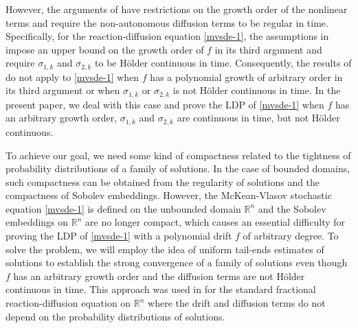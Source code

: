 \documentclass[11pt]{article}
\numberwithin{equation}{section}
\theoremstyle{plain}
\begin{document}
 However, the arguments of \cite{hll2021AMO, hhl2022arXiv}
 have restrictions on the growth order of the nonlinear terms
 and require the  non-autonomous diffusion terms to be regular in time.
 Specifically, for the reaction-diffusion equation \eqref{mvsde-1},
 the assumptions in \cite{hll2021AMO, hhl2022arXiv}
 impose an upper bound on the growth order of $f$ in its third argument and require $\sigma_{1,k}$
 and $\sigma_{2,k}$ to be H\"{o}lder continuous in time.
 Consequently, the results of \cite{hll2021AMO, hhl2022arXiv}
 do not apply to \eqref{mvsde-1}
 when $f$ has a polynomial  growth of
 arbitrary order in its third argument
 or when $\sigma_{1,k}$
 or $\sigma_{2,k}$ is not H\"{o}lder continuous in time.
 In the present paper,
 we deal with this case and prove the LDP of \eqref{mvsde-1}
 when $f$ has an arbitrary  growth order,
 $\sigma_{1,k}$ and $\sigma_{2,k}$  are continuous in time,
 but not H\"{o}lder continuous.

 To achieve our goal,
 we need some kind of compactness related to the tightness of probability distributions of a family of solutions.
 In the case of bounded domains,
 such compactness can be obtained from
 the regularity of solutions and the compactness of Sobolev embeddings.
 However,
 the McKean-Vlasov stochastic equation \eqref{mvsde-1}
 is defined on the unbounded domain $\mathbb{R}^n$
 and the Sobolev embeddings on $\mathbb{R}^n$ are no longer compact,
 which causes an essential difficulty for proving the LDP of \eqref{mvsde-1} with a polynomial drift $f$ of arbitrary degree.
 To solve the problem,
 we will employ the idea of uniform tail-ends estimates of solutions to establish the strong convergence of a family of solutions
 even though $f$ has an arbitrary growth order and the diffusion terms are not H\"{o}lder continuous in time.
 This approach was used in \cite{wangb2023JDE} for the standard fractional reaction-diffusion equation on $\mathbb{R}^n$
 where the drift and diffusion terms do not depend
 on the probability distributions of solutions.
\end{document}
